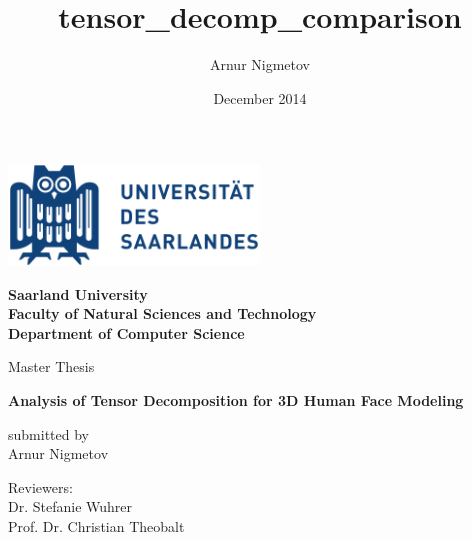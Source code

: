 \documentclass[12pt]{report}
\title{tensor_decomp_comparison}
\author{Arnur Nigmetov }
\date{December 2014}
\begin{document}
\begin{titlepage}
    \begin{center}
        \vspace{0.3cm}
        
        \includegraphics[width=0.5\textwidth]{images/uni-logo.png}
        
        
        \vspace{1.7cm}
        
        \Large 
        \textbf{Saarland University}\\
        \textbf{Faculty of Natural Sciences and Technology}\\
        \textbf{Department of Computer Science}\\
        
        
        \vspace{1.5cm}
        
        \Large
        Master Thesis
        
        
        \vspace{0.5cm}
        
        \LARGE
        \textbf{Analysis of Tensor Decomposition for 3D Human Face Modeling}
        
        \vspace{1.5cm}
        
        {submitted by}\\
        {Arnur Nigmetov}\\
        
        \vfill
        
        Reviewers:\\
        Dr. Stefanie Wuhrer\\
        Prof. Dr. Christian Theobalt
        
        
        \vspace{1.2cm}
        
        
        
    \end{center}
\end{titlepage}


\newpage
\thispagestyle{empty}
\mbox{}
        
\thispagestyle{empty}
\vspace{1.5cm}
\end{document}
